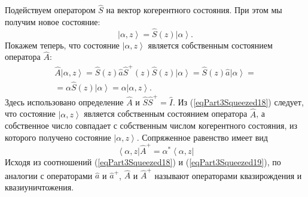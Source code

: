 Подействуем оператором $\hat{S}$ на вектор когерентного состояния. При
этом мы получим новое состояние:
\begin{equation}
\left|\alpha, z\right> = \hat{S}\left(z\right)\left|\alpha\right>.
\label{eqPart3Squeezed17}
\end{equation}
Покажем теперь, что состояние $\left|\alpha, z\right>$ является
собственным состоянием оператора $\hat{A}$:
\begin{eqnarray}
\hat{A}\left|\alpha, z\right> = 
\hat{S}\left(z\right)\hat{a}\hat{S}^{+}\left(z\right)\hat{S}\left(z\right)\left|\alpha\right>
= 
\hat{S}\left(z\right)\hat{a}\left|\alpha\right> = 
\nonumber \\
= \alpha \hat{S}\left(z\right)\left|\alpha\right> = 
\alpha \left|\alpha, z\right>.
\label{eqPart3Squeezed18}
\end{eqnarray}
Здесь использовано определение $\hat{A}$ и $\hat{S}\hat{S}^{+} = \hat{I}$.
Из (\ref{eqPart3Squeezed18}) следует, что состояние $\left|\alpha, z\right>$ является
собственным состоянием оператора $\hat{A}$, а собственное число совпадает с
собственным числом когерентного состояния, из которого получено
состояние $\left|\alpha, z\right>$.
Сопряженное равенство имеет вид
\begin{equation}
\left<\alpha, z\right|\hat{A}^{+} = 
\alpha^{*}\left<\alpha, z\right|
\label{eqPart3Squeezed19}
\end{equation}
Исходя из соотношений (\ref{eqPart3Squeezed18}) и
(\ref{eqPart3Squeezed19}), по аналогии с операторами $\hat{a}$ и
$\hat{a}^{+}$, $\hat{A}$ и $\hat{A}^{+}$ называют операторами
квазирождения и квазиуничтожения.

